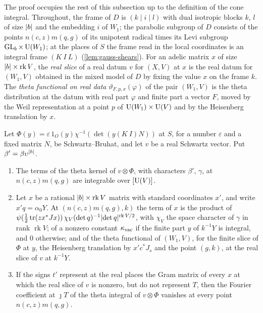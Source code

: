 The proof occupies the rest of this subsection up to the definition of the cone integral. Throughout, the frame of $D$ is $(k\mid i\mid l)$ with dual isotropic blocks $k$, $l$ of size $\lvert b\rvert$ and the
embedding $i$ of $W_1$; the parabolic subgroup of $D$ consists of the points $n(c,z)m(q,g)$ of its unipotent radical times its Levi subgroup $\operatorname{GL}_b\times\operatorname{U}(W_1)$; at the places of $S$ the frame read in the
local coordinates is an integral frame $(K\ I\ L)$ (\cref{lem:gauss-shears}). For an adelic matrix $x$ of size $\lvert b\rvert\times\operatorname{rk}V$, the \emph{real slice} of a real datum $v$ for $(X,V)$ at $x$ is the real
datum for $(W_1,V)$ obtained in the mixed model of $D$ by fixing the value $x$ on the frame $k$. The \emph{theta functional on real data} $\vartheta_{F,p,x}(\varphi)$ of the pair $(W_1,V)$ is the theta
distribution at the datum with real part $\varphi$ and finite part a vector $F$, moved by the Weil representation at a point $p$ of $\operatorname{U}(W_1)\times\operatorname{U}(V)$ and by the Heisenberg translation by $x$.

\begin{lemma}\label{lem:unfolded-terms}
Let $\Phi(y)=\varepsilon\,1_O(y)\chi^{-1}(\det(y(K\ I)N))$ at $S$, for a number $\varepsilon$ and a fixed matrix $N$, be Schwartz--Bruhat, and let $v$ be a real Schwartz vector. Put $\beta'=\beta\upsilon^{\lvert b\rvert}$.
\begin{enumerate}[label=\textup{(\alph*)}]
\item The terms of the theta kernel of $v\otimes\Phi$, with characters $\beta'$, $\gamma$, at $n(c,z)m(q,g)$ are integrable over $[\operatorname{U}(V)]$.
\item Let $x$ be a rational $\lvert b\rvert\times\operatorname{rk}V$ matrix with standard coordinates $x'$, and write $x'q=\alpha_0Y$. At $(n(c,z)m(q,g),k)$ the term of $x$ is the product of
$\psi(\tfrac12\operatorname{tr}(zx^*Jx))\,\chi_V(\det q)^{-1}\lvert \det q\rvert^{\operatorname{rk}V/2}$, with $\chi_V$ the space character of $\gamma$ in rank $\operatorname{rk}V$; of a nonzero constant $\kappa_{\rm vac}$ if the finite part
$y$ of $k^{-1}Y$ is integral, and $0$ otherwise; and of the theta functional of $(W_1,V)$, for the finite slice of $\Phi$ at $y$, the Heisenberg translation by $x'c^*J_s$ and the point $(g,k)$, at the real slice of
$v$ at $k^{-1}Y$.
\item If the signs $t'$ represent at the real places the Gram matrix of every $x$ at which the real slice of $v$ is nonzero, but do not represent $T$, then the Fourier coefficient at $\jmath T$ of the theta
integral of $v\otimes\Phi$ vanishes at every point $n(c,z)m(q,g)$.
\end{enumerate}
\end{lemma}

